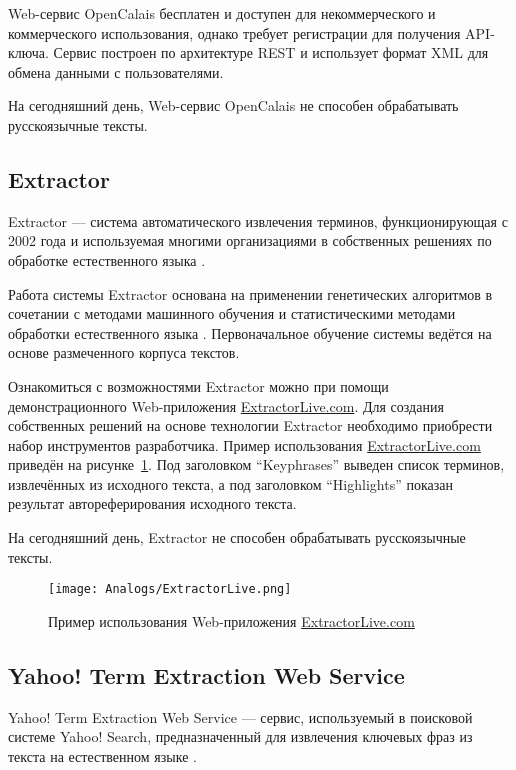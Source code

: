 Web-сервис OpenCalais бесплатен и доступен для некоммерческого и
коммерческого использования, однако требует регистрации для получения
API-ключа. Сервис построен по архитектуре REST \cite{Fielding00} и
использует формат XML \cite{XML} для обмена данными с пользователями.

На сегодняшний день, Web-сервис OpenCalais не способен обрабатывать
русскоязычные тексты.

\subsection{Extractor}
\label{subsec:Extractor}
Extractor — система автоматического извлечения терминов,
функционирующая с 2002 года и используемая многими организациями в
собственных решениях по обработке естественного языка
\cite{Extractor}.

Работа системы Extractor основана на применении генетических
алгоритмов \cite{Brownlee11} в сочетании с методами машинного
обучения и статистическими методами обработки естественного
языка \cite{Turney00}. Первоначальное обучение системы ведётся
на основе размеченного корпуса текстов.

Ознакомиться с возможностями Extractor можно при помощи
демонстрационного Web-приложения \url{ExtractorLive.com}.
Для создания собственных решений на основе технологии Extractor
необходимо приобрести набор инструментов разработчика. Пример
использования \url{ExtractorLive.com} приведён на
рисунке~\ref{fig:Analogs:Extractor}. Под заголовком “Keyphrases”
выведен список терминов, извлечённых из исходного текста, а под
заголовком “Highlights” показан результат автореферирования
исходного текста.

На сегодняшний день, Extractor не способен обрабатывать
русскоязычные тексты.

\begin{landscape}
\begin{figure}[ht]
  \centering
  \texttt{[image: Analogs/ExtractorLive.png]}
  \caption{Пример использования Web-приложения \url{ExtractorLive.com}}
  \label{fig:Analogs:Extractor}
\end{figure}
\end{landscape}

\subsection{Yahoo! Term Extraction Web Service}
\label{subsec:YahooTermExtractionWebService}
Yahoo! Term Extraction Web Service — сервис, используемый в поисковой
системе Yahoo! Search, предназначенный для извлечения ключевых фраз
из текста на естественном языке \cite{YahooTermExtractionWebService}.

